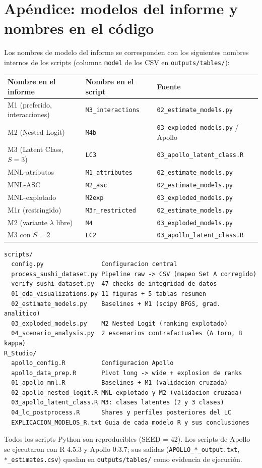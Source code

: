 \documentclass[12pt,a4paper]{article}
\begin{document}
\section{Apéndice: modelos del informe y nombres en el código}
\label{app:map}

Los nombres de modelo del informe se corresponden con los siguientes nombres internos de los scripts (columna \texttt{model} de los CSV en \texttt{outputs/tables/}):

\begin{table}[H]
  \centering
  \small
  \begin{tabular}{lll}
    \toprule
    Nombre en el informe & Nombre en el script & Fuente \\
    \midrule
    M1 (preferido, interacciones)  & \texttt{M3\_interactions} & \texttt{02\_estimate\_models.py} \\
    M2 (Nested Logit)              & \texttt{M4b}              & \texttt{03\_exploded\_models.py} / Apollo \\
    M3 (Latent Class, $S=3$)       & \texttt{LC3}              & \texttt{03\_apollo\_latent\_class.R} \\
    MNL-atributos                  & \texttt{M1\_attributes}   & \texttt{02\_estimate\_models.py} \\
    MNL-ASC                        & \texttt{M2\_asc}          & \texttt{02\_estimate\_models.py} \\
    MNL-explotado                  & \texttt{M2exp}            & \texttt{03\_exploded\_models.py} \\
    M1r (restringido)              & \texttt{M3r\_restricted}  & \texttt{02\_estimate\_models.py} \\
    M2 (variante $\lambda$ libre)  & \texttt{M4}               & \texttt{03\_exploded\_models.py} \\
    M3 con $S=2$                   & \texttt{LC2}              & \texttt{03\_apollo\_latent\_class.R} \\
    \bottomrule
  \end{tabular}
\end{table}

\begin{verbatim}
scripts/
  config.py                Configuracion central
  process_sushi_dataset.py Pipeline raw -> CSV (mapeo Set A corregido)
  verify_sushi_dataset.py  47 checks de integridad de datos
  01_eda_visualizations.py 11 figuras + 5 tablas resumen
  02_estimate_models.py    Baselines + M1 (scipy BFGS, grad. analitico)
  03_exploded_models.py    M2 Nested Logit (ranking explotado)
  04_scenario_analysis.py  2 escenarios contrafactuales (A toro, B kappa)
R_Studio/
  apollo_config.R          Configuracion Apollo
  apollo_data_prep.R       Pivot long -> wide + explosion de ranks
  01_apollo_mnl.R          Baselines + M1 (validacion cruzada)
  02_apollo_nested_logit.R MNL-explotado y M2 (validacion cruzada)
  03_apollo_latent_class.R M3: clases latentes (2 y 3 clases)
  04_lc_postprocess.R      Shares y perfiles posteriores del LC
  EXPLICACION_MODELOS_R.txt Guia de cada modelo R y sus conclusiones
\end{verbatim}

Todos los scripts Python son reproducibles (SEED = 42). Los scripts de Apollo se ejecutaron con R 4.5.3 y Apollo 0.3.7; sus salidas (\texttt{APOLLO\_*\_output.txt}, \texttt{*\_estimates.csv}) quedan en \texttt{outputs/tables/} como evidencia de ejecución.
\end{document}
